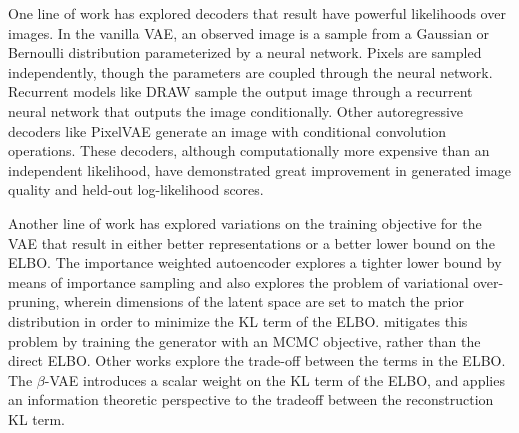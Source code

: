 One line of work has explored
decoders that result have powerful
likelihoods over images.
In the vanilla VAE, an observed image
is a sample 
from a Gaussian 
or Bernoulli distribution
parameterized by a neural network.
Pixels are sampled independently,
though the parameters are coupled
through the neural network.
Recurrent models like 
DRAW \citep{Gregor2015}
sample the output image
through a recurrent
neural network that outputs
the image conditionally.
Other autoregressive decoders
like PixelVAE \citep{Gulrajani2016}
generate an image with conditional
convolution
operations.
These decoders, although
computationally more
expensive than an independent likelihood,
have demonstrated great improvement in
generated image quality and 
held-out log-likelihood scores.

Another line of work
has explored variations
on the training objective
for the VAE that result in
either better representations
or a better lower bound on the
ELBO. The importance weighted autoencoder \citep{Burda2015}
explores a tighter lower bound by means
of importance sampling and also
explores the problem of variational
over-pruning, wherein
dimensions of the latent space
are set to match the prior distribution
in order to minimize the KL term of the ELBO.
\citet{Hoffman2017} mitigates
this problem by training the generator
with an MCMC objective, rather than the direct
ELBO. Other works explore the trade-off
between the terms in the ELBO. The $\beta$-VAE \citep{Higgins2017}
introduces a scalar weight on the KL term of the ELBO,
and \citet{Alemi2017} applies
an information theoretic perspective to the tradeoff
between the reconstruction KL term.
